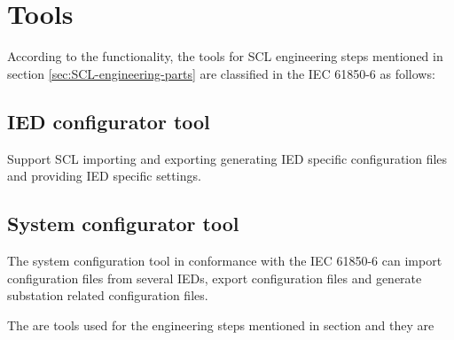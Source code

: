 \section{Tools}

According to the functionality, the tools for 
SCL engineering steps 
mentioned in section \ref{sec:SCL-engineering-parts} are
classified in the IEC 61850-6 \cite{IEC61850-6:2004} as
follows:

\subsection{IED configurator tool}
Support SCL importing and exporting generating IED specific 
configuration files and providing IED specific settings.

\subsection{System configurator tool}
\label{sec:ch-scl--System-configurator-tool}
The system configuration tool in conformance
with the IEC 61850-6 \cite{IEC61850-6:2004} can import 
configuration files from several \glspl{IED}, 
export configuration files and generate 
substation related configuration files.

The are tools used for the engineering steps 
mentioned in section  
and they are 

